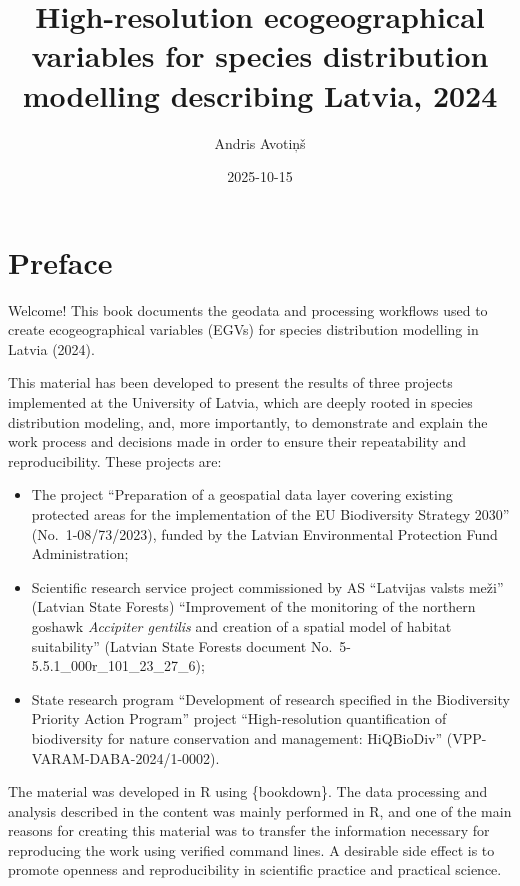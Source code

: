 \documentclass[
]{book}
\title{High-resolution ecogeographical variables for species distribution modelling describing Latvia, 2024}
\author{Andris Avotiņš}
\date{2025-10-15}
\begin{document}
\maketitle

{
\setcounter{tocdepth}{1}
\tableofcontents
}
\chapter*{Preface}\label{preface}

Welcome! This book documents the geodata and processing workflows used to create
ecogeographical variables (EGVs) for species distribution modelling in Latvia (2024).

This material has been developed to present the results of three projects
implemented at the University of Latvia, which are deeply rooted in species
distribution modeling, and, more importantly, to demonstrate and explain the
work process and decisions made in order to ensure their repeatability and
reproducibility. These projects are:

\begin{itemize}
\item
  The project ``Preparation of a geospatial data layer covering existing
  protected areas for the implementation of the EU Biodiversity Strategy
  2030'' (No.~1-08/73/2023), funded by the Latvian Environmental Protection Fund
  Administration;
\item
  Scientific research service project commissioned by AS ``Latvijas valsts
  meži'' (Latvian State Forests) ``Improvement of the monitoring of the northern
  goshawk \emph{Accipiter gentilis} and creation of a spatial model of habitat
  suitability'' (Latvian State Forests document No.~5-5.5.1\_000r\_101\_23\_27\_6);
\item
  State research program ``Development of research specified in the Biodiversity
  Priority Action Program'' project ``High-resolution quantification of biodiversity
  for nature conservation and management: HiQBioDiv'' (VPP-VARAM-DABA-2024/1-0002).
\end{itemize}

The material was developed in R using \{bookdown\}. The data processing and analysis
described in the content was mainly performed in R, and one of the main reasons
for creating this material was to transfer the information necessary for
reproducing the work using verified command lines. A desirable side effect
is to promote openness and reproducibility in scientific practice and practical
science.
\end{document}
